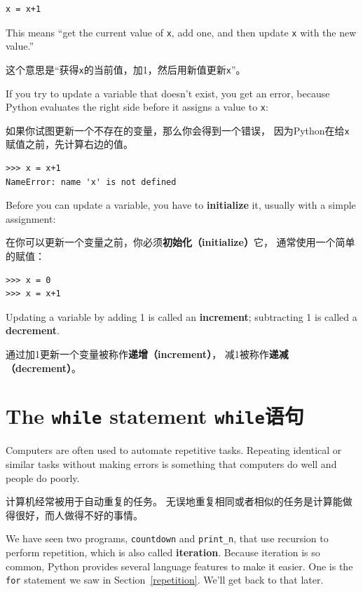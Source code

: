 \documentclass[10pt]{book}
\begin{document}
\begin{CJK}{UTF8}{gbsn}
\begin{verbatim}
x = x+1
\end{verbatim}
%
This means ``get the current value of {\tt x}, add one, and then
update {\tt x} with the new value.''

这个意思是``获得{\tt x}的当前值，加1，然后用新值更新{\tt x}''。

If you try to update a variable that doesn't exist, you get an
error, because Python evaluates the right side before it assigns
a value to {\tt x}:

如果你试图更新一个不存在的变量，那么你会得到一个错误，
因为Python在给{\tt x}赋值之前，先计算右边的值。

\begin{verbatim}
>>> x = x+1
NameError: name 'x' is not defined
\end{verbatim}
%
Before you can update a variable, you have to {\bf initialize}
it, usually with a simple assignment:

在你可以更新一个变量之前，你必须{\bf 初始化（initialize）}它，
通常使用一个简单的赋值：

\begin{verbatim}
>>> x = 0
>>> x = x+1
\end{verbatim}
%
Updating a variable by adding 1 is called an {\bf increment};
subtracting 1 is called a {\bf decrement}.


通过加1更新一个变量被称作{\bf 递增（increment）}，
减1被称作{\bf 递减（decrement）}。



\section{The {\tt while} statement {\tt while}语句}

Computers are often used to automate repetitive tasks.  Repeating
identical or similar tasks without making errors is something that
computers do well and people do poorly.

计算机经常被用于自动重复的任务。
无误地重复相同或者相似的任务是计算能做得很好，而人做得不好的事情。

We have seen two programs, {\tt countdown} and \verb"print_n", that
use recursion to perform repetition, which is also called {\bf
iteration}.  Because iteration is so common, Python provides several
language features to make it easier.  One is the {\tt for} statement
we saw in Section~\ref{repetition}.  We'll get back to that later.


\end{CJK}
\end{document}
